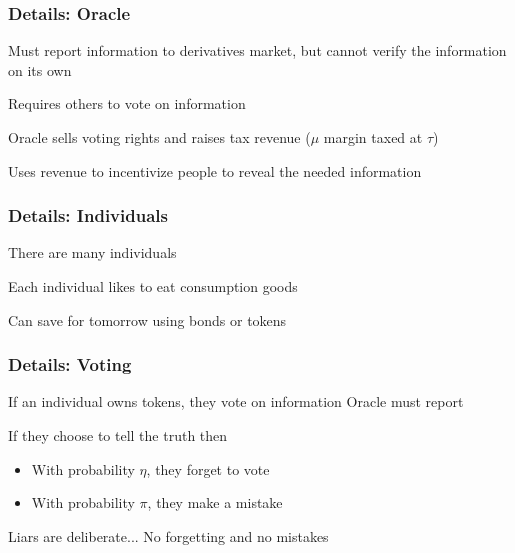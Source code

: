 \documentclass[10pt]{beamer}
\begin{document}
\begin{frame} \frametitle{Details: Oracle}

  Must report information to derivatives market, but cannot verify the
  information on its own

  Requires others to vote on information

  Oracle sells voting rights and raises tax revenue ($\mu$ margin taxed at $\tau$)

  Uses revenue to incentivize people to reveal the needed information

\end{frame}

\begin{frame} \frametitle{Details: Individuals}

  There are many individuals

  Each individual likes to eat consumption goods

  Can save for tomorrow using bonds or tokens

\end{frame}

\begin{frame} \frametitle{Details: Voting}

  If an individual owns tokens, they vote on information Oracle must report

  If they choose to tell the truth then

  \begin{itemize}
    \item With probability $\eta$, they forget to vote
    \item With probability $\pi$, they make a mistake
  \end{itemize}

  Liars are deliberate... No forgetting and no mistakes

\end{frame}
\end{document}
